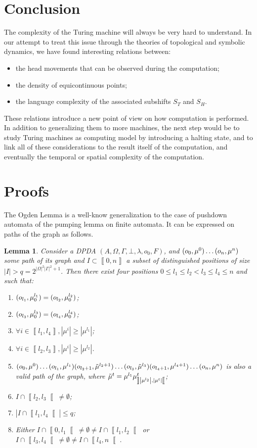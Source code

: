 \documentclass{llncs}
\newtheorem{lem}{Lemma}
\newcommand{\length}[1]{\left|#1\right|}
\newcommand{\card}[1]{\left|#1\right|}
\newcommand{\co}[2]{\left\llbracket #1,#2\right\llbracket}\newcommand{\cc}[2]{\left\llbracket #1,#2\right\rrbracket}\newcommand{\oo}[2]{\left\rrbracket #1,#2\right\llbracket}\newcommand{\oc}[2]{\left\rrbracket #1,#2\right\rrbracket}\newcommand{\ci}[1]{\co{#1}\infty}\newcommand{\io}[1]{\oo{-\infty}{#1}}\newcommand{\oi}[1]{\oo{#1}\infty}\newcommand{\ic}[1]{\oc{-\infty}{#1}}
\begin{document}
\section*{Conclusion}
The complexity of the Turing machine will always be very hard to understand.
In our attempt to treat this issue through the theories of topological and symbolic dynamics, we have found interesting relations between:
\begin{itemize}
 \item the head movements that can be observed during the computation;
 \item the density of equicontinuous points;
 \item the language complexity of the associated subshifts $S_T$ and $S_H$.
\end{itemize} 
These relations introduce a new point of view on how computation is performed.
In addition to generalizing them to more machines, the next step would be to study Turing machines as computing model by introducing a halting state, and to link all of these considerations to the result itself of the computation, and eventually the temporal or spatial complexity of the computation.



\newpage

\appendix\section*{Proofs}
The Ogden Lemma \cite{Odge} is a well-know generalization to the case of pushdown automata of the pumping lemma on finite automata. It can be expressed on paths of the graph as follows.
\begin{lem}\label{l:bomba}
 Consider a DPDA $(A,\Omega,\Gamma,\bot,\lambda,o_0,F)$, and $\pile0\ldots\pile n$ some path of its graph and $I\subset\cc0n$ a subset of distinguished positions of size $\card I>q=2^{\card\Omega^2\card\Gamma^2+1}$.
Then there exist four positions $0\le l_1\le l_2<l_3\le l_4\le n$ and such that:
\begin{enumerate}
 \item $\pilo{l_1}=\pilo{l_2}$;
 \item $\pilo{l_3}=\pilo{l_4}$;
 \item $\forall i\in\cc{l_1}{l_4},\length{\mu^{i}}\ge\length{\mu^{l_1}}$;
 \item $\forall i\in\cc{l_2}{l_3},\length{\mu^{i}}\ge\length{\mu^{l_2}}$.
 \item $\pile0\ldots\pile{l_1}\pile[\tilde]{l_2+1}\ldots\pile[\tilde]{l_3}\pile{l_4+1}\ldots\pile n$ is also a valid path of the graph, where $\tilde\mu^{t}=\mu^{l_1}\mu^{t}\soo{\length{\mu^{l_2}}}{\length{\mu^{t}}}$;
 \item $I\cap\co{l_2}{l_3}\ne\emptyset$;
 \item $\card{I\cap\co{l_1}{l_4}}\le q$;
 \item Either $I\cap\co0{l_1}\ne\emptyset\ne I\cap\co{l_1}{l_2}$ or $I\cap\co{l_3}{l_4}\ne\emptyset\ne I\cap\co{l_4}n$.
\end{enumerate}
\end{lem}
\end{document}
